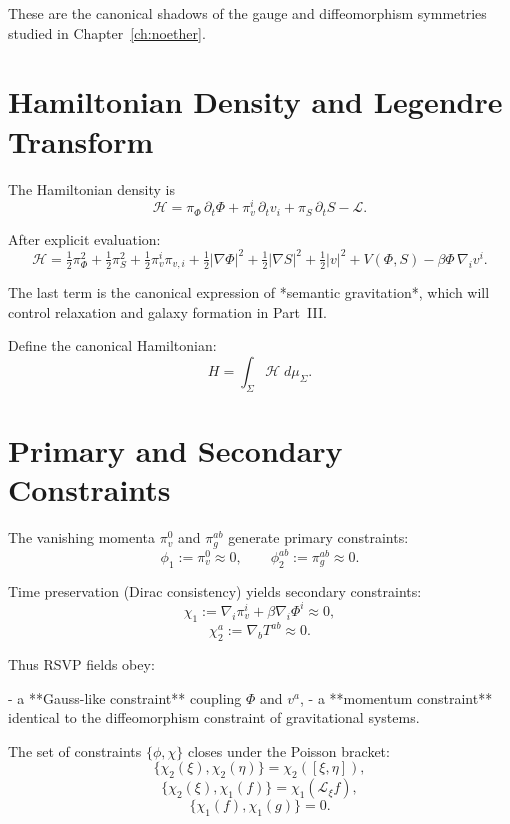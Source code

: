 These are the canonical shadows of the gauge and diffeomorphism symmetries
studied in Chapter~\ref{ch:noether}.

\section{Hamiltonian Density and Legendre Transform}

The Hamiltonian density is
\[
\mathcal{H}
  = \pi_\Phi \,\partial_t \Phi
  + \pi^i_v \,\partial_t v_i
  + \pi_S \,\partial_t S
  - \mathcal{L}.
\]

After explicit evaluation:
\[
\mathcal{H}
 = \tfrac{1}{2} \pi_\Phi^2
 + \tfrac{1}{2} \pi_S^2
 + \tfrac{1}{2} \pi^i_v \pi_{v,i}
 + \tfrac{1}{2} |\nabla \Phi|^2
 + \tfrac{1}{2} |\nabla S|^2
 + \tfrac{1}{2} |v|^2
 + V(\Phi,S)
 - \beta \Phi\, \nabla_i v^i.
\]

The last term is the canonical expression of *semantic gravitation*, which
will control relaxation and galaxy formation in Part~III.

Define the canonical Hamiltonian:
\[
H = \int_\Sigma \mathcal{H}\; d\mu_\Sigma.
\]

\section{Primary and Secondary Constraints}

The vanishing momenta $\pi_v^0$ and $\pi_g^{ab}$ generate primary constraints:
\[
\phi_1 := \pi_v^0 \approx 0,\qquad
\phi_2^{ab} := \pi_g^{ab} \approx 0.
\]

Time preservation (Dirac consistency) yields secondary constraints:
\[
\chi_1 := \nabla_i \pi^i_v + \beta \nabla_i \Phi^i \approx 0,
\]
\[
\chi_2^a := \nabla_b T^{ab} \approx 0.
\]

Thus RSVP fields obey:

- a **Gauss-like constraint** coupling $\Phi$ and $v^a$,  
- a **momentum constraint** identical to the diffeomorphism constraint
  of gravitational systems.

\begin{theorem}
The set of constraints $\{\phi, \chi\}$ closes under the Poisson bracket:
\[
\{\chi_2(\xi), \chi_2(\eta)\}
    = \chi_2([\xi,\eta]),
\]
\[
\{\chi_2(\xi), \chi_1(f)\}
    = \chi_1(\mathcal{L}_\xi f),
\]
\[
\{\chi_1(f), \chi_1(g)\}
    = 0.
\]
\end{theorem}

